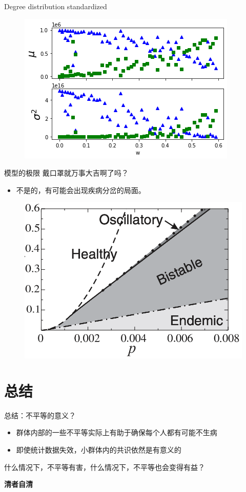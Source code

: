 \documentclass{beamer}
\begin{document}
\begin{frame}{Degree distribution standardized}
    \begin{figure}
        \centering
        \includegraphics[width = 0.5\linewidth]{figs/degreediststandardized (1).png}
    \end{figure}
\end{frame}

\begin{frame}{模型的极限}
戴口罩就万事大吉啊了吗？
\begin{itemize}
    \item 不是的，有可能会出现疾病分岔的局面。
\end{itemize}
\begin{figure}
    \centering
    \includegraphics[width = 0.6\linewidth]{figs/截屏2020-07-10 下午8.18.02.png}
\end{figure}
\end{frame}

\section{总结}

\begin{frame}{总结：不平等的意义？}

\begin{itemize}
    \item 群体内部的一些不平等实际上有助于确保每个人都有可能不生病
    \item 即使统计数据失效，小群体内的共识依然是有意义的
\end{itemize}
\begin{center}
    什么情况下，不平等有害，什么情况下，不平等也会变得有益？
    
    \vspace{1cm}

    \textbf{清者自清}
\end{center}
    
\end{frame}
\end{document}
